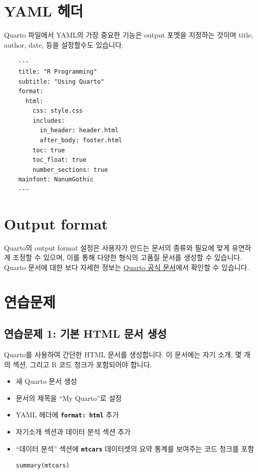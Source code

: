 \documentclass[
  a4paper,
]{book}
\begin{document}
\hypertarget{yaml-uxd5e4uxb354-1}{%
\section{YAML 헤더}\label{yaml-uxd5e4uxb354-1}}

Quarto 파일에서 YAML의 가장 중요한 기능은 output 포멧을 지정하는 것이며
title, author, date, 등을 설정할수도 있습니다.

\begin{verbatim}
    ---
    title: "R Programming"
    subtitle: "Using Quarto"
    format:
      html:
        css: style.css
        includes:
          in_header: header.html
          after_body: footer.html
        toc: true
        toc_float: true
        number_sections: true
    mainfont: NanumGothic
    ---
\end{verbatim}

\hypertarget{output-format-1}{%
\section{Output format}\label{output-format-1}}

Quarto의 output format 설정은 사용자가 만드는 문서의 종류와 필요에 맞게
유연하게 조정할 수 있으며, 이를 통해 다양한 형식의 고품질 문서를 생성할
수 있습니다. Quarto 문서에 대한 보다 자세한 정보는
\href{https://quarto.org/docs/guide/}{Quarto 공식 문서}에서 확인할 수
있습니다.

\hypertarget{uxc5f0uxc2b5uxbb38uxc81c-1}{%
\section{연습문제}\label{uxc5f0uxc2b5uxbb38uxc81c-1}}

\hypertarget{uxc5f0uxc2b5uxbb38uxc81c-1-uxae30uxbcf8-html-uxbb38uxc11c-uxc0dduxc131-1}{%
\subsection{연습문제 1: 기본 HTML 문서
생성}\label{uxc5f0uxc2b5uxbb38uxc81c-1-uxae30uxbcf8-html-uxbb38uxc11c-uxc0dduxc131-1}}

Quarto를 사용하여 간단한 HTML 문서를 생성합니다. 이 문서에는 자기 소개,
몇 개의 섹션, 그리고 R 코드 청크가 포함되어야 합니다.

\begin{itemize}
\item
  새 Quarto 문서 생성
\item
  문서의 제목을 ``My Quarto''로 설정
\item
  YAML 헤더에 \textbf{\texttt{format:\ html}} 추가
\item
  자기소개 섹션과 데이터 분석 섹션 추가
\item
  ``데이터 분석'' 섹션에 \textbf{\texttt{mtcars}} 데이터셋의 요약 통계를
  보여주는 코드 청크를 포함

\begin{verbatim}
summary(mtcars)
\end{verbatim}
\end{itemize}
\end{document}
